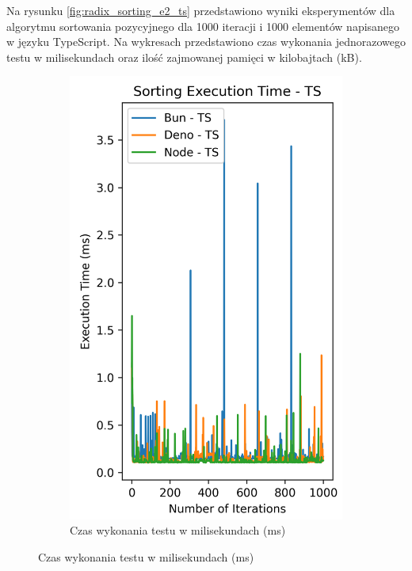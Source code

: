 Na rysunku \ref{fig:radix_sorting_e2_ts} przedstawiono wyniki eksperymentów dla algorytmu sortowania pozycyjnego dla 1000 iteracji i 1000 elementów napisanego w języku TypeScript. Na wykresach przedstawiono czas wykonania jednorazowego testu w milisekundach oraz ilość zajmowanej pamięci w kilobajtach (kB).

\begin{figure}[H]
  \centering
  \begin{subfigure}[b]{0.44\textwidth}
    \centering
    \includegraphics[width=\textwidth]{Figures/sorting/sorting_radix_1000_1000_ts_time.png}
    \caption{Czas wykonania testu w milisekundach (ms)}
    \label{fig:radix_sorting_e2_ts_time}

\end{subfigure}
\end{figure}
